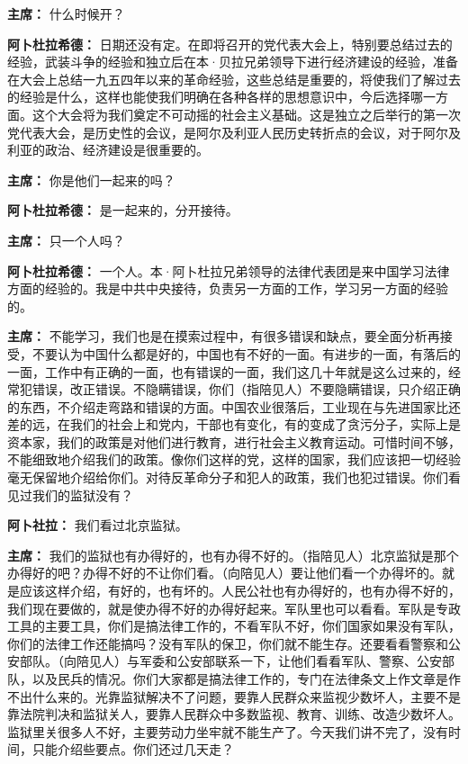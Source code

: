 \begin{duihua}
\item[\textbf{主席：}] 什么时候开？

\item[\textbf{阿卜杜拉希德：}] 日期还没有定。在即将召开的党代表大会上，特别要总结过去的经验，武装斗争的经验和独立后在本·贝拉兄弟领导下进行经济建设的经验，准备在大会上总结一九五四年以来的革命经验，这些总结是重要的，将使我们了解过去的经验是什么，这样也能使我们明确在各种各样的思想意识中，今后选择哪一方面。这个大会将为我们奠定不可动摇的社会主义基础。这是独立之后举行的第一次党代表大会，是历史性的会议，是阿尔及利亚人民历史转折点的会议，对于阿尔及利亚的政治、经济建设是很重要的。

\item[\textbf{主席：}] 你是他们一起来的吗？

\item[\textbf{阿卜杜拉希德：}] 是一起来的，分开接待。

\item[\textbf{主席：}] 只一个人吗？

\item[\textbf{阿卜杜拉希德：}] 一个人。本·阿卜杜拉兄弟领导的法律代表团是来中国学习法律方面的经验的。我是中共中央接待，负责另一方面的工作，学习另一方面的经验的。

\item[\textbf{主席：}] 不能学习，我们也是在摸索过程中，有很多错误和缺点，要全面分析再接受，不要认为中国什么都是好的，中国也有不好的一面。有进步的一面，有落后的一面，工作中有正确的一面，也有错误的一面，我们这几十年就是这么过来的，经常犯错误，改正错误。不隐瞒错误，你们（指陪见人）不要隐瞒错误，只介绍正确的东西，不介绍走弯路和错误的方面。中国农业很落后，工业现在与先进国家比还差的远，在我们的社会上和党内，干部也有变化，有的变成了贪污分子，实际上是资本家，我们的政策是对他们进行教育，进行社会主义教育运动。可惜时间不够，不能细致地介绍我们的政策。像你们这样的党，这样的国家，我们应该把一切经验毫无保留地介绍给你们。对待反革命分子和犯人的政策，我们也犯过错误。你们看见过我们的监狱没有？

\item[\textbf{阿卜社拉：}] 我们看过北京监狱。

\item[\textbf{主席：}] 我们的监狱也有办得好的，也有办得不好的。（指陪见人）北京监狱是那个办得好的吧？办得不好的不让你们看。（向陪见人）要让他们看一个办得坏的。就是应该这样介绍，有好的，也有坏的。人民公社也有办得好的，也有办得不好的，我们现在要做的，就是使办得不好的办得好起来。军队里也可以看看。军队是专政工具的主要工具，你们是搞法律工作的，不看军队不好，你们国家如果没有军队，你们的法律工作还能搞吗？没有军队的保卫，你们就不能生存。还要看看警察和公安部队。（向陪见人）与军委和公安部联系一下，让他们看看军队、警察、公安部队，以及民兵的情况。你们大家都是搞法律工作的，专门在法律条文上作文章是作不出什么来的。光靠监狱解决不了问题，要靠人民群众来监视少数坏人，主要不是靠法院判决和监狱关人，要靠人民群众中多数监视、教育、训练、改造少数坏人。监狱里关很多人不好，主要劳动力坐牢就不能生产了。今天我们讲不完了，没有时间，只能介绍些要点。你们还过几天走？


\end{duihua}
